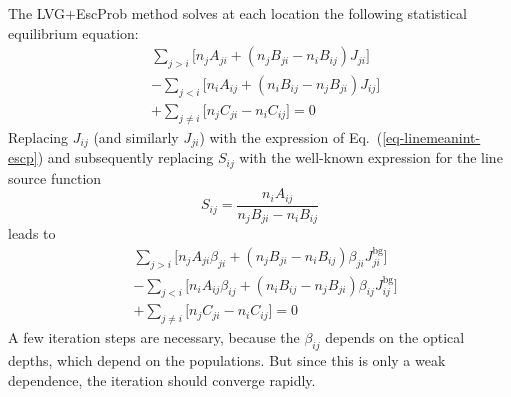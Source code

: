 \documentclass{report}
\begin{document}
The LVG+EscProb method solves at each location the following statistical
equilibrium equation:
\begin{equation}
\begin{split}
& \sum_{j>i} \Big[ n_jA_{ji} + (n_jB_{ji}-n_iB_{ij})J_{ji}\Big]\\
& - \sum_{j<i} \Big[ n_iA_{ij} + (n_iB_{ij}-n_jB_{ji})J_{ij}\Big]\\
& + \sum_{j\neq i}\big[n_jC_{ji}-n_iC_{ij}\big]=0
\end{split}
\end{equation}
Replacing $J_{ij}$ (and similarly $J_{ji}$) with the expression of
Eq.~(\ref{eq-linemeanint-escp}) and subsequently replacing $S_{ij}$ with the
well-known expression for the line source function
\begin{equation}
S_{ij} = \frac{n_iA_{ij}}{n_jB_{ji}-n_iB_{ij}}
\end{equation}
leads to
\begin{equation}
\begin{split}
& \sum_{j>i} \Big[ n_jA_{ji}\beta_{ji} + (n_jB_{ji}-n_iB_{ij})\beta_{ji}J^{\mathrm{bg}}_{ji}\Big]\\
& - \sum_{j<i} \Big[ n_iA_{ij}\beta_{ij} + (n_iB_{ij}-n_jB_{ji})\beta_{ij}J^{\mathrm{bg}}_{ij}\Big]\\
& + \sum_{j\neq i}\big[n_jC_{ji}-n_iC_{ij}\big]=0
\end{split}
\end{equation}
A few iteration steps are necessary, because the $\beta_{ij}$ depends on the
optical depths, which depend on the populations. But since this is only a
weak dependence, the iteration should converge rapidly.
\end{document}
